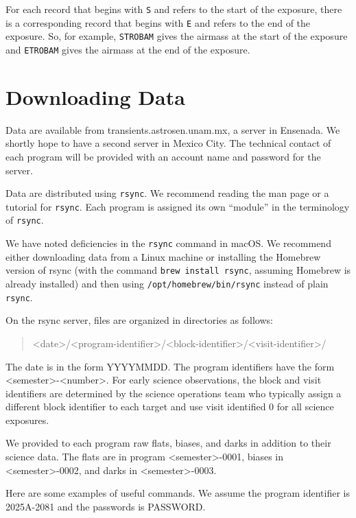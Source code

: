 For each record that begins with \verb|S| and refers to the start of the exposure, there is a corresponding record that begins with \verb|E| and refers to the end of the exposure. So, for example, \verb|STROBAM| gives the airmass at the start of the exposure and \verb|ETROBAM| gives the airmass at the end of the exposure.

\section{Downloading Data}

Data are available from transients.astrosen.unam.mx, a server in Ensenada. We shortly hope to have a second server in Mexico City. The technical contact of each program will be provided with an account name and password for the server.

Data are distributed using \verb|rsync|. We recommend reading the man page or a tutorial for \verb|rsync|. Each program is assigned its own “module” in the terminology of \verb|rsync|. 

We have noted deficiencies in the \verb|rsync| command in macOS. We recommend either downloading data from a Linux machine or installing the Homebrew version of rsync (with the command \verb|brew install rsync|, assuming Homebrew is already installed) and then using \verb|/opt/homebrew/bin/rsync| instead of plain \verb|rsync|.

On the rsync server, files are organized in directories as follows:
\begin{quote}\footnotesize
<date>/<program-identifier>/<block-identifier>/<visit-identifier>/
\end{quote}

The date is in the form YYYYMMDD. The program identifiers have the form <semester>-<number>. For early science observations, the block and visit identifiers are determined by the science operations team who typically assign a different block identifier to each target and use visit identified 0 for all science exposures.

We provided to each program raw flats, biases, and darks in addition to their science data. The flats are in program <semester>-0001, biases in <semester>-0002, and darks in <semester>-0003.

Here are some examples of useful commands. We assume the program identifier is 2025A-2081 and the passwords is PASSWORD.

